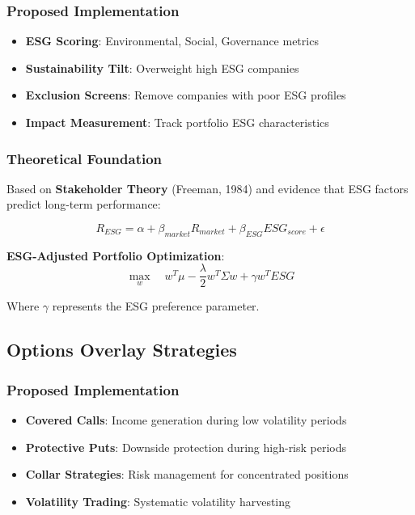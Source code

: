 \documentclass[12pt,a4paper]{article}
\begin{document}
\subsubsection{Proposed Implementation}
\begin{itemize}
    \item \textbf{ESG Scoring}: Environmental, Social, Governance metrics
    \item \textbf{Sustainability Tilt}: Overweight high ESG companies
    \item \textbf{Exclusion Screens}: Remove companies with poor ESG profiles
    \item \textbf{Impact Measurement}: Track portfolio ESG characteristics
\end{itemize}

\subsubsection{Theoretical Foundation}
Based on \textbf{Stakeholder Theory} (Freeman, 1984) and evidence that ESG factors predict long-term performance:

\begin{equation}
R_{ESG} = \alpha + \beta_{market} R_{market} + \beta_{ESG} ESG_{score} + \epsilon
\end{equation}

\textbf{ESG-Adjusted Portfolio Optimization}:
\begin{equation}
\max_w \quad w^T\mu - \frac{\lambda}{2}w^T\Sigma w + \gamma w^T ESG
\end{equation}

Where $\gamma$ represents the ESG preference parameter.

\subsection{Options Overlay Strategies}

\subsubsection{Proposed Implementation}
\begin{itemize}
    \item \textbf{Covered Calls}: Income generation during low volatility periods
    \item \textbf{Protective Puts}: Downside protection during high-risk periods
    \item \textbf{Collar Strategies}: Risk management for concentrated positions
    \item \textbf{Volatility Trading}: Systematic volatility harvesting
\end{itemize}
\end{document}

